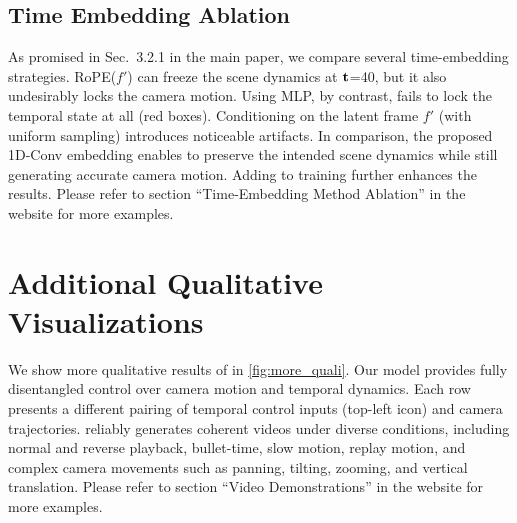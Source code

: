\subsection{Time Embedding Ablation}

As promised in Sec.~3.2.1 in the main paper, we compare several time-embedding strategies. RoPE($f'$) can freeze the scene dynamics at $\mathbf{t}$=40, but it also undesirably locks the camera motion. 
Using MLP, by contrast, fails to lock the temporal state at all (red boxes).
Conditioning on the latent frame $f'$ (with uniform sampling) introduces noticeable artifacts. 
In comparison, the proposed 1D-Conv embedding enables \nameMethod to preserve the intended scene dynamics while still generating accurate camera motion. Adding \texttt{\nameDataset} to training further enhances the results. Please refer to section ``Time-Embedding Method Ablation'' in the website for more examples.

\section{Additional Qualitative Visualizations}
We show more qualitative results of \nameMethod in \cref{fig:more_quali}.
Our model provides fully disentangled control over camera motion and temporal dynamics. Each row presents a different pairing of temporal control inputs (top-left icon) and camera trajectories. \nameMethod reliably generates coherent videos under diverse conditions, including normal and reverse playback, bullet-time, slow motion, replay motion, and complex camera movements such as panning, tilting, zooming, and vertical translation. Please refer to section ``Video Demonstrations'' in the website for more examples. 

\clearpage
